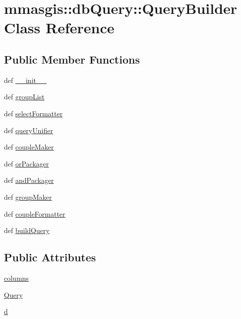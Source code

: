 \hypertarget{classmmasgis_1_1dbQuery_1_1QueryBuilder}{
\section{mmasgis::dbQuery::QueryBuilder Class Reference}
\label{classmmasgis_1_1dbQuery_1_1QueryBuilder}
}
\subsection*{Public Member Functions}
\begin{DoxyCompactItemize}
\item 
def \hyperlink{classmmasgis_1_1dbQuery_1_1QueryBuilder_a4cb9814e056a4dfd9426b2cc579e9971}{\_\-\_\-init\_\-\_\-}
\item 
def \hyperlink{classmmasgis_1_1dbQuery_1_1QueryBuilder_a01122231193ae936cbd64c7b8dd4d241}{groupList}
\item 
def \hyperlink{classmmasgis_1_1dbQuery_1_1QueryBuilder_a9e6dce9a3999325f7a0c8276b929c2de}{selectFormatter}
\item 
def \hyperlink{classmmasgis_1_1dbQuery_1_1QueryBuilder_a3c683a2dc2d2f6cb35846330887c347c}{queryUnifier}
\item 
def \hyperlink{classmmasgis_1_1dbQuery_1_1QueryBuilder_aca2bc914b8e8d100d2a918b67db45502}{coupleMaker}
\item 
def \hyperlink{classmmasgis_1_1dbQuery_1_1QueryBuilder_a2398fa9b3c4464923389339015c58543}{orPackager}
\item 
def \hyperlink{classmmasgis_1_1dbQuery_1_1QueryBuilder_a0369a426cbf0fe2d1adcbfde20273a62}{andPackager}
\item 
def \hyperlink{classmmasgis_1_1dbQuery_1_1QueryBuilder_aa5c83bf2fe93be0b9e25b4da610ade03}{groupMaker}
\item 
def \hyperlink{classmmasgis_1_1dbQuery_1_1QueryBuilder_aca74db261e89dde9901949e14af2045e}{coupleFormatter}
\item 
def \hyperlink{classmmasgis_1_1dbQuery_1_1QueryBuilder_a16fb699303cc4831812854e5f9faf8b7}{buildQuery}
\end{DoxyCompactItemize}
\subsection*{Public Attributes}
\begin{DoxyCompactItemize}
\item 
\hyperlink{classmmasgis_1_1dbQuery_1_1QueryBuilder_a1c49061d6d8fb94b8fc1c5d7ea5cc77b}{columns}
\item 
\hyperlink{classmmasgis_1_1dbQuery_1_1QueryBuilder_a9808b65c97bebf9ca620e72b741d9d55}{Query}
\item 
\hyperlink{classmmasgis_1_1dbQuery_1_1QueryBuilder_afd03606d75ffde100f068a95e0dc17bf}{d}
\end{DoxyCompactItemize}


